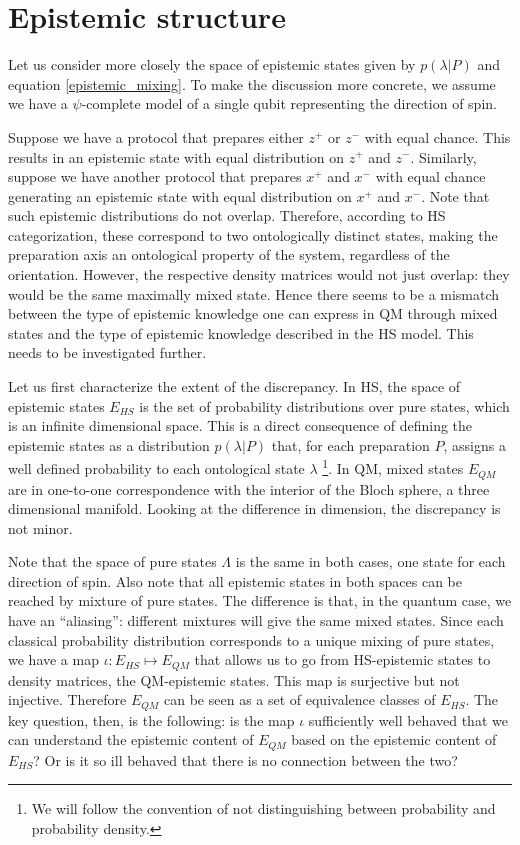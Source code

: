 \documentclass[twocolumn,prl,floatfix,superscriptaddress]{revtex4-2}
\begin{document}
\section{Epistemic structure}

Let us consider more closely the space of epistemic states given by $p(\lambda | P)$ and equation \ref{epistemic_mixing}. To make the discussion more concrete, we assume we have a $\psi$-complete model of a single qubit representing the direction of spin.

Suppose we have a protocol that prepares either $z^+$ or $z^-$ with equal chance. This results in an epistemic state with equal distribution on $z^+$ and $z^-$. Similarly, suppose we have another protocol that prepares $x^+$ and $x^-$ with equal chance generating an epistemic state with equal distribution on $x^+$ and $x^-$. Note that such epistemic distributions do not overlap. Therefore, according to HS categorization, these correspond to two ontologically distinct states, making the preparation axis an ontological property of the system, regardless of the orientation. However, the respective density matrices would not just overlap: they would be the same maximally mixed state. Hence there seems to be a mismatch between the type of epistemic knowledge one can express in QM through mixed states and the type of epistemic knowledge described in the HS model. This needs to be investigated further.

Let us first characterize the extent of the discrepancy. In HS, the space of epistemic states $E_{HS}$ is the set of probability distributions over pure states, which is an infinite dimensional space. This is a direct consequence of defining the epistemic states as a distribution $p(\lambda|P)$ that, for each preparation $P$, assigns a well defined probability to each ontological state $\lambda$ \footnote{We will follow the convention of not distinguishing between probability and probability density.}. In QM, mixed states $E_{QM}$ are in one-to-one correspondence with the interior of the Bloch sphere, a three dimensional manifold. Looking at the difference in dimension, the discrepancy is not minor.

Note that the space of pure states $\Lambda$ is the same in both cases, one state for each direction of spin. Also note that all epistemic states in both spaces can be reached by mixture of pure states. The difference is that, in the quantum case, we have an ``aliasing'': different mixtures will give the same mixed states. Since each classical probability distribution corresponds to a unique mixing of pure states, we have a map $\iota : E_{HS} \mapsto E_{QM}$ that allows us to go from HS-epistemic states to density matrices, the QM-epistemic states. This map is surjective but not injective. Therefore $E_{QM}$ can be seen as a set of equivalence classes of $E_{HS}$. The key question, then, is the following: is the map $\iota$ sufficiently well behaved that we can understand the epistemic content of $E_{QM}$ based on the epistemic content of $E_{HS}$? Or is it so ill behaved that there is no connection between the two?
\end{document}
